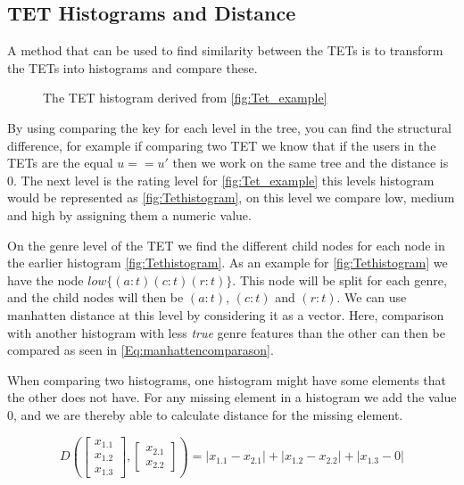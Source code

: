 \subsection{TET Histograms and Distance}
	A method that can be used to find similarity between the TETs is to transform the TETs into histograms and compare these\cite{JAEGER201330}. 
	\begin{figure}[H]
		\centering
		\begin{adjustbox}{width=0.5\textwidth}
			
		\end{adjustbox}
		\caption{The TET histogram derived from \autoref{fig:Tet_example}}
		\label{fig:Tethistogram}
	\end{figure}

	By using comparing the key for each level in the tree, you can find the structural difference, for example if comparing two TET we know that if the users in the TETs are the equal $u == u'$ then we work on the same tree and the distance is $0$. The next level is the rating level for \autoref{fig:Tet_example} this levels histogram would be represented as \autoref{fig:Tethistogram}, on this level we compare low, medium and high by assigning them a numeric value.
	
	On the genre level of the TET we find the different child nodes for each node in the earlier histogram \autoref{fig:Tethistogram}. As an example for  \autoref{fig:Tethistogram} we have the node  $low\{(a:t)(c:t)(r:t)\}$. This node will be split for each genre,  and the child nodes will then be  $(a:t)$, $(c:t)$ and $(r:t)$. We can use manhatten distance at this level by considering it as a vector. Here, comparison with another histogram with less \textit{true} genre features than the other can then be compared as seen in \autoref{Eq:manhattencomparason}\cite{singh2013k}.
	
	When comparing two histograms, one histogram might have some elements that the other does not have. For any missing element in a histogram we add the value $0$, and we are thereby able to calculate distance for the missing element.
	
	\begin{equation}\label{Eq:manhattencomparason}
	D(\begin{bmatrix}
	x_{1.1} \\
	x_{1.2} \\
	x_{1.3}
	\end{bmatrix},
	\begin{bmatrix}
	x_{2.1} \\
	x_{2.2}
	\end{bmatrix})= |x_{1.1} - x_{2.1}| + |x_{1.2} - x_{2.2}| + |x_{1.3} - 0|
	\end{equation}
	
